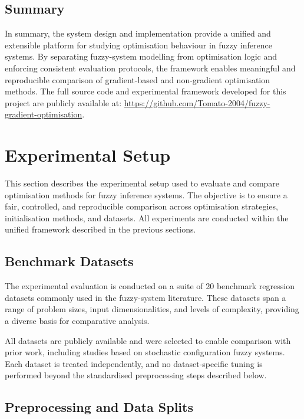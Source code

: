 \documentclass[a4paper,12pt,oneside]{article}
\begin{document}
\subsection{Summary}

In summary, the system design and implementation provide a unified and extensible platform for studying optimisation behaviour in fuzzy inference systems. By separating fuzzy-system modelling from optimisation logic and enforcing consistent evaluation protocols, the framework enables meaningful and reproducible comparison of gradient-based and non-gradient optimisation methods.
The full source code and experimental framework developed for this project are publicly available at:
\url{https://github.com/Tomato-2004/fuzzy-gradient-optimisation}.

\newpage
\section{Experimental Setup}

This section describes the experimental setup used to evaluate and compare optimisation methods for fuzzy inference systems. The objective is to ensure a fair, controlled, and reproducible comparison across optimisation strategies, initialisation methods, and datasets. All experiments are conducted within the unified framework described in the previous sections.

\subsection{Benchmark Datasets}

The experimental evaluation is conducted on a suite of 20 benchmark regression datasets commonly used in the fuzzy-system literature. These datasets span a range of problem sizes, input dimensionalities, and levels of complexity, providing a diverse basis for comparative analysis.

All datasets are publicly available and were selected to enable comparison with prior work, including studies based on stochastic configuration fuzzy systems. Each dataset is treated independently, and no dataset-specific tuning is performed beyond the standardised preprocessing steps described below.

\subsection{Preprocessing and Data Splits}
\end{document}
